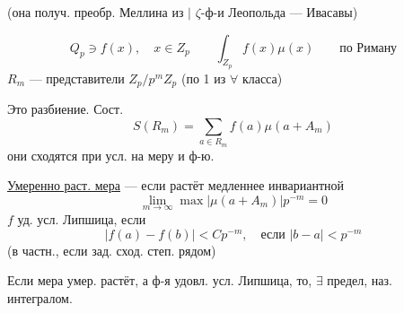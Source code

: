 (она получ. преобр. Меллина из $\vert$ $\zeta$-ф-и Леопольда — Ивасавы)


\[
Q_p\ni f(x),\quad x\in Z_p\qquad
\int_{Z_p}f(x)\mu(x)\qquad\text{по Риману}
\]
$R_m$ — представители $Z_p/p^mZ_p$ (по 1 из $\forall$ класса)

Это разбиение. Сост.
\[
S(R_m)=\sum_{a\in R_m}f(a)\mu(a+A_m)
\]
они сходятся при усл. на меру и ф-ю.

\uline{Умеренно раст. мера} — если растёт медленнее инвариантной
\[
\lim_{m\to\infty}\max|\mu(a+A_m)|p^{-m}=0
\]
$f$ уд. усл. Липшица, если
\[
 |f(a)-f(b)|<Cp^{-m},\quad\text{если }|b-a|<p^{-m}
\]
(в частн., если зад. сход. степ. рядом)

Если мера умер. растёт, а ф-я удовл. усл. Липшица, то, $\exists$ предел, наз. интегралом.


